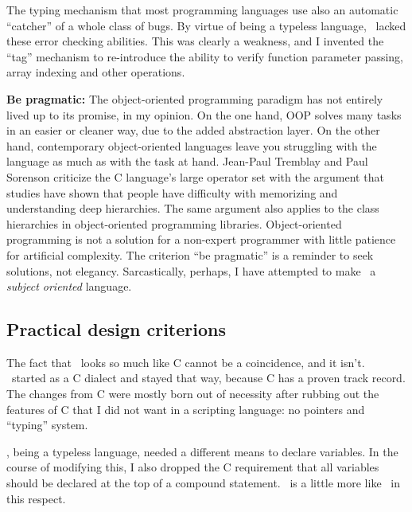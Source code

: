 {{
The typing mechanism that most programming languages use also an automatic
``catcher'' of a whole class of bugs. By virtue of being a typeless language,
\Small\ lacked these error checking abilities. This was clearly a weakness,
and I invented the ``tag'' mechanism to re-introduce the ability to
verify function parameter passing, array indexing and other operations.

  
{\bf Be pragmatic:} The object-oriented programming paradigm has not entirely
lived up to its promise, in my opinion. On the one hand, OOP solves many tasks
in an easier or cleaner way, due to the added abstraction layer. On the other
hand, contemporary object-oriented languages leave you struggling with the
language as much as with the task at hand. Jean-Paul Tremblay and Paul Sorenson
criticize the C language's large operator set with the argument that studies
have shown that people have difficulty with memorizing and understanding deep
hierarchies. The same argument also applies to the class
hierarchies in object-oriented programming libraries. Object-oriented
programming is not a solution for a non-expert programmer with little patience
for artificial complexity. The criterion ``be pragmatic'' is a reminder to
seek solutions, not elegancy. Sarcastically, perhaps, I have attempted to make
\Small\ a {\it subject oriented\/} language.


\subsection{Practical design criterions}

The fact that \Small\ looks so much like C cannot be a coincidence, and it isn't.
\Small\ started as a C dialect and stayed that way, because C has a proven track
record. The changes from C were mostly born out of necessity after rubbing out
the features of C that I did not want in a scripting language: no pointers and
``typing'' system.

\Small, being a typeless language, needed a different means to declare
variables. In the course of modifying this, I also dropped the C requirement
that all variables should be declared at the top of a compound statement.
\Small\ is a little more like \Cpp\ in this respect.

}}
